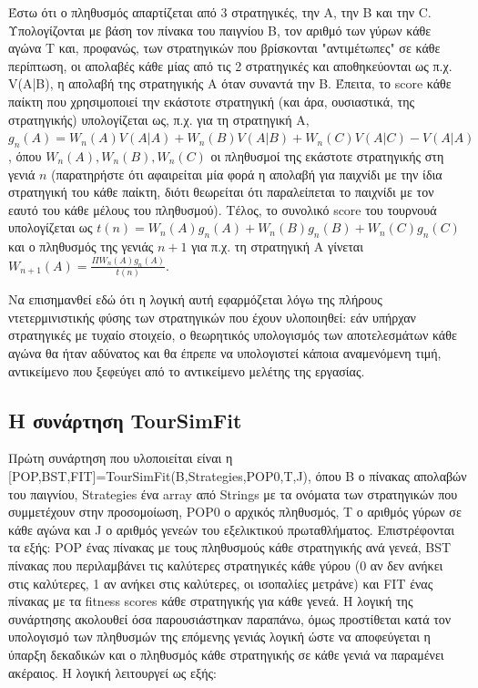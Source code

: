 \documentclass[12pt]{article}
\begin{document}
Έστω ότι ο πληθυσμός απαρτίζεται από 3 στρατηγικές, την A, την B και την C. Υπολογίζονται με βάση τον πίνακα του παιγνίου B, τον αριθμό των γύρων κάθε αγώνα T και, προφανώς, των στρατηγικών που βρίσκονται "αντιμέτωπες" σε κάθε περίπτωση, οι απολαβές κάθε μίας από τις 2 στρατηγικές και αποθηκεύονται ως π.χ. V(A|B), η απολαβή της στρατηγικής A όταν συναντά την B. Έπειτα, το score κάθε παίκτη που χρησιμοποιεί την εκάστοτε στρατηγική (και άρα, ουσιαστικά, της στρατηγικής) υπολογίζεται ως, π.χ. για τη στρατηγική A, $g_n(A) = W_n(A)V(A|A) + W_n(B)V(A|B) + W_n(C)V(A|C) − V(A|A)$ , όπου $W_n(A), W_n(B), W_n(C)$ οι πληθυσμοί της εκάστοτε στρατηγικής στη γενιά $n$ (παρατηρήστε ότι αφαιρείται μία φορά η απολαβή για παιχνίδι με την ίδια στρατηγική του κάθε παίκτη, διότι θεωρείται ότι παραλείπεται το παιχνίδι με τον εαυτό του κάθε μέλους του πληθυσμού). Τέλος, το συνολικό score του τουρνουά υπολογίζεται ως $t(n) = W_n(A)g_n(A) + W_n(B)g_n(B) + W_n(C)g_n(C)$ και ο πληθυσμός της γενιάς $n+1$ για π.χ. τη στρατηγική A γίνεται $W_{n+1}(A) = \frac{\Pi W_n(A)g_n(A)}{t(n)}$. 

Να επισημανθεί εδώ ότι η λογική αυτή εφαρμόζεται λόγω της πλήρους ντετερμινιστικής φύσης των στρατηγικών που έχουν υλοποιηθεί: εάν υπήρχαν στρατηγικές με τυχαίο στοιχείο, ο θεωρητικός υπολογισμός των αποτελεσμάτων κάθε αγώνα θα ήταν αδύνατος και θα έπρεπε να υπολογιστεί κάποια αναμενόμενη τιμή, αντικείμενο που ξεφεύγει από το αντικείμενο μελέτης της εργασίας.
\subsection{Η συνάρτηση TourSimFit}
Πρώτη συνάρτηση που υλοποιείται είναι η [POP,BST,FIT]=TourSimFit(B,Strategies,POP0,T,J), όπου B ο πίνακας απολαβών του παιγνίου, Strategies ένα array από Strings με τα ονόματα των στρατηγικών που συμμετέχουν στην προσομοίωση, POP0 ο αρχικός πληθυσμός, T ο αριθμός γύρων σε κάθε αγώνα και J ο αριθμός γενεών του εξελικτικού πρωταθλήματος. Επιστρέφονται τα εξής: POP ένας πίνακας με τους πληθυσμούς κάθε στρατηγικής ανά γενεά, BST πίνακας που περιλαμβάνει τις καλύτερες στρατηγικές κάθε γύρου (0 αν δεν ανήκει στις καλύτερες, 1 αν ανήκει στις καλύτερες, οι ισοπαλίες μετράνε) και FIT ένας πίνακας με τα fitness scores κάθε στρατηγικής για κάθε γενεά. Η λογική της συνάρτησης ακολουθεί όσα παρουσιάστηκαν παραπάνω, όμως προστίθεται κατά τον υπολογισμό των πληθυσμών της επόμενης γενιάς λογική ώστε να αποφεύγεται η ύπαρξη δεκαδικών και ο πληθυσμός κάθε στρατηγικής σε κάθε γενιά να παραμένει ακέραιος. Η λογική λειτουργεί ως εξής:
\end{document}
